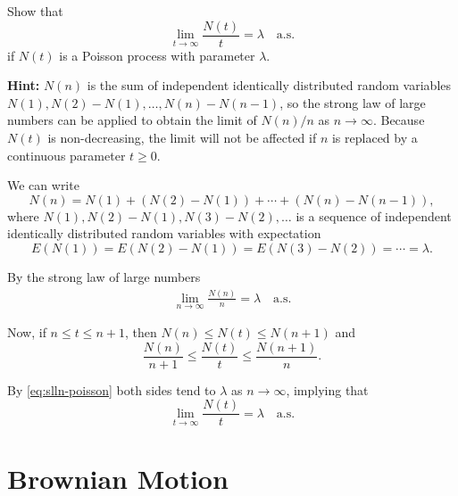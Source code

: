 \begin{Exercise}
\label{ex:poisson-strong-law}
Show that
\[
\lim_{t \to \infty} \frac{N(t)}{t} = \lambda \quad \text{a.s.}
\]
if $N(t)$ is a Poisson process with parameter $\lambda$.

\noindent\textbf{Hint:} $N(n)$ is the sum of independent identically distributed random variables $N(1), N(2) - N(1), \ldots, N(n) - N(n-1)$, so the strong law of large numbers can be applied to obtain the limit of $N(n)/n$ as $n \to \infty$. Because $N(t)$ is non-decreasing, the limit will not be affected if $n$ is replaced by a continuous parameter $t \geq 0$.
\end{Exercise}

\begin{Solution}
We can write
\[
N(n) = N(1) + (N(2) - N(1)) + \cdots + (N(n) - N(n-1)),
\]
where $N(1), N(2) - N(1), N(3) - N(2), \ldots$ is a sequence of independent identically distributed random variables with expectation
\[
E(N(1)) = E(N(2) - N(1)) = E(N(3) - N(2)) = \cdots = \lambda.
\]

By the strong law of large numbers
\begin{align}
\lim_{n \to \infty} \frac{N(n)}{n} = \lambda \quad \text{a.s.} \tag{6.8}
\label{eq:slln-poisson}
\end{align}

Now, if $n \leq t \leq n+1$, then $N(n) \leq N(t) \leq N(n+1)$ and
\[
\frac{N(n)}{n+1} \leq \frac{N(t)}{t} \leq \frac{N(n+1)}{n}.
\]

By \cref{eq:slln-poisson} both sides tend to $\lambda$ as $n \to \infty$, implying that
\[
\lim_{t \to \infty} \frac{N(t)}{t} = \lambda \quad \text{a.s.}
\]
\end{Solution}

\section{Brownian Motion}
\label{sec:brownian-motion}

